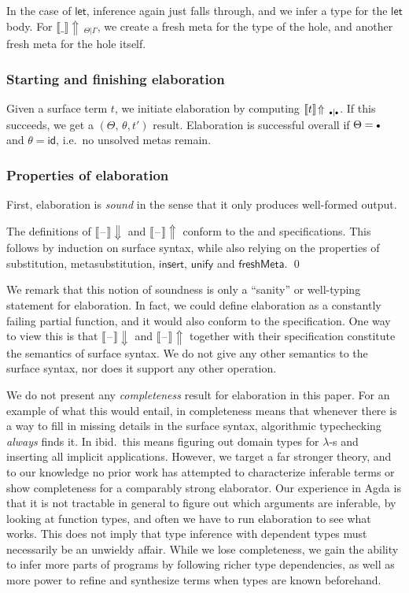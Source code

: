 \documentclass[acmsmall,review,anonymous,prologue,dvipsnames]{acmart}\settopmatter{printfolios=true,printccs=false,printacmref=false}
\newcommand{\slet}{\boldsymbol{\mathsf{let}}}
\newcommand{\emptycon}{\scaleobj{.75}\bullet}
\newcommand{\id}{\mathsf{id}}
\newcommand{\blank}{\mathord{\hspace{1pt}\text{--}\hspace{1pt}}}
\newcommand{\unify}{\mathsf{unify}}
\newcommand{\echeckblank}{\llbracket\blank\rrbracket\!\Downarrow}
\newcommand{\einferblank}{\llbracket\blank\rrbracket\!\Uparrow}
\newcommand{\einfer}[3]{\llbracket#1\rrbracket\!\Uparrow\,_{#2|#3}}
\theoremstyle{remark}
\begin{document}
In the case of $\slet$, inference again just falls through, and we infer a type
for the $\slet$ body. For $\einfer{\_}{\Theta}{\Gamma}$, we create a fresh meta
for the type of the hole, and another fresh meta for the hole itself.

\subsubsection{Starting and finishing elaboration} Given a surface term $t$,
we initiate elaboration by computing $\einfer{t}{\emptycon}{\emptycon}$. If this
succeeds, we get a $(\Theta,\,\theta,t')$ result. Elaboration is successful overall
if $\Theta = \emptycon$ and $\theta = \id$, i.e.\ no unsolved metas remain.

\subsubsection{Properties of elaboration}
First, elaboration is \emph{sound} in the sense that it only produces well-formed
output.

\begin{theorem}[Soundness] The definitions of $\echeckblank$ and
$\einferblank$ conform to the  and 
  specifications. This follows by induction on surface syntax, while also
  relying on the properties of substitution, metasubstitution,
  $\mathsf{insert}$, $\unify$ and $\mathsf{freshMeta}$. \qed
\end{theorem}

We remark that this notion of soundness is only a ``sanity'' or well-typing
statement for elaboration. In fact, we could define elaboration as a constantly
failing partial function, and it would also conform to the specification. One
way to view this is that $\echeckblank$ and $\einferblank$ together with their
specification constitute the semantics of surface syntax. We do not give any
other semantics to the surface syntax, nor does it support any other operation.

We do not present any \emph{completeness} result for elaboration in this
paper. For an example of what this would entail, in \cite{dunfield2013complete}
completeness means that whenever there is a way to fill in missing details in
the surface syntax, algorithmic typechecking \emph{always} finds it. In
ibid.\ this means figuring out domain types for $\lambda$-s and inserting all
implicit applications. However, we target a far stronger theory, and to our
knowledge no prior work has attempted to characterize inferable terms or show
completeness for a comparably strong elaborator. Our experience in Agda is that
it is not tractable in general to figure out which arguments are inferable, by
looking at function types, and often we have to run elaboration to see what
works. This does not imply that type inference with dependent types must
necessarily be an unwieldy affair. While we lose completeness, we gain the
ability to infer more parts of programs by following richer type dependencies,
as well as more power to refine and synthesize terms when types are known
beforehand.
\end{document}
